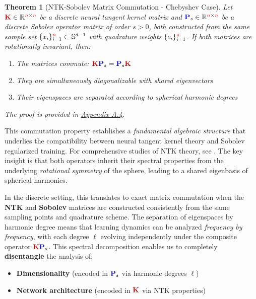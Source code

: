 \documentclass[a4paper]{article}
\newcommand{\Kop}{\textcolor{kernelcolor}{\mathbf{K}}}
\newcommand{\Pop}{\textcolor{sobolevcolor}{\mathbf{P}}}
\theoremstyle{plain}
\newtheorem{theorem}{Theorem}[section]
\theoremstyle{definition}
\theoremstyle{remark}
\begin{document}
\begin{theorem}[NTK-Sobolev Matrix Commutation - Chebyshev Case]
\label{thm:ntk_sobolev_commutation}
Let $\Kop \in \mathbb{R}^{\textcolor{red}{n} \times \textcolor{red}{n}}$ be a discrete \textit{neural tangent kernel matrix} and $\Pop_s \in \mathbb{R}^{\textcolor{red}{n} \times \textcolor{red}{n}}$ be a discrete \textit{Sobolev operator matrix} of order $s > 0$, both constructed from the same sample set $\{x_i\}_{i=1}^{\textcolor{red}{n}} \subset \mathbb{S}^{d-1}$ with quadrature weights $\{c_i\}_{i=1}^{\textcolor{red}{n}}$. If both matrices are rotationally invariant, then:
\begin{enumerate}
    \item The matrices commute: $\Kop\Pop_s = \Pop_s\Kop$
    \item They are simultaneously diagonalizable with shared eigenvectors
    \item Their eigenspaces are separated according to spherical harmonic degrees
\end{enumerate}
The proof is provided in \hyperref[sec:appendix_commutation]{Appendix A.4}.
\end{theorem}
\begin{tcolorbox}[colback=green!10,colframe=green!60!black,title={\textbf{Personal Contribution : Fundamental Algebraic Structure of NTK-Sobolev Commutation}},enhanced,drop shadow]
    This commutation property establishes a \textit{fundamental algebraic structure} that underlies the compatibility between neural tangent kernel theory and Sobolev regularized training. For comprehensive studies of NTK theory, see \cite{golikov2022ntk_survey}. The key insight is that both operators inherit their spectral properties from the underlying \textit{rotational symmetry} of the sphere, leading to a shared eigenbasis of spherical harmonics.

    In the discrete setting, this translates to exact matrix commutation when the \textcolor{kernelcolor}{\textbf{NTK}} and \textcolor{sobolevcolor}{\textbf{Sobolev}} matrices are constructed consistently from the same sampling points and quadrature scheme. The separation of eigenspaces by harmonic degree means that learning dynamics can be analyzed \textit{frequency by frequency}, with each degree $\ell$ evolving independently under the composite operator $\Kop\Pop_s$.
    This spectral decomposition enables us to completely \textbf{disentangle} the analysis of:
\begin{itemize}
\item \textcolor{sobolevcolor}{\textbf{Dimensionality}} (encoded in $\Pop_s$ via harmonic degrees $\ell$)
\item \textcolor{kernelcolor}{\textbf{Network architecture}} (encoded in $\Kop$ via NTK properties)
\end{itemize}
\end{tcolorbox}
\end{document}
